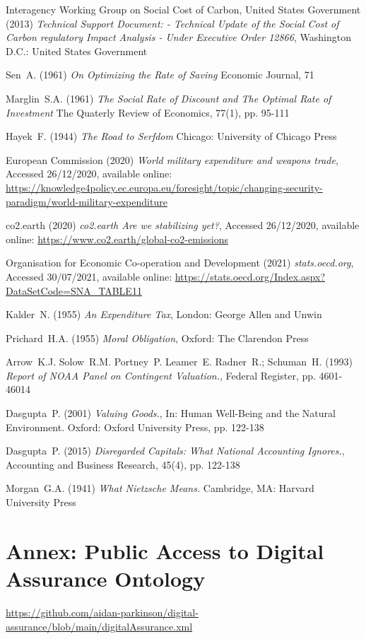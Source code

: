 \documentclass[11pt, oneside]{article}   	%
\begin{document}
\begin{thebibliography}{99}
 Interagency Working Group on Social Cost of Carbon, United States Government (2013)
\emph{Technical Support Document: - Technical Update of the Social Cost of Carbon regulatory Impact Analysis - Under Executive Order 12866},
Washington D.C.: United States Government
	
 Sen~A. (1961)
\emph{On Optimizing the Rate of Saving}
Economic Journal, 71
	
 Marglin~S.A. (1961)
\emph{The Social Rate of Discount and The Optimal Rate of Investment}
The Quaterly Review of Economics, 77(1), pp. 95-111
	
 Hayek~F. (1944)
\emph{The Road to Serfdom}
Chicago: University of Chicago Press
	
 European Commission (2020)
\emph{World military expenditure and weapons trade},
Accessed 26/12/2020, available online: 
\url{https://knowledge4policy.ec.europa.eu/foresight/topic/changing-security-paradigm/world-military-expenditure}
	
 co2.earth (2020)
\emph{co2.earth Are we stabilizing yet?},
Accessed 26/12/2020, available online: 
\url{https://www.co2.earth/global-co2-emissions}
	
 Organisation for Economic Co-operation and Development (2021)
\emph{stats.oecd.org},
Accessed 30/07/2021, available online: 
\url{https://stats.oecd.org/Index.aspx?DataSetCode=SNA_TABLE11}
	
 Kalder~N. (1955)
\emph{An Expenditure Tax},
London: George Allen and Unwin
	
 Prichard~H.A. (1955)
\emph{Moral Obligation},
Oxford: The Clarendon Press

 Arrow~K.J. Solow~R.M. Portney~P. Leamer~E. Radner~R.; Schuman~H. (1993)
\emph{Report of NOAA Panel on Contingent Valuation.},
Federal Register, pp. 4601-46014
	
 Dasgupta~P. (2001)
\emph{Valuing Goods.},
In: Human Well-Being and the Natural Environment. Oxford: Oxford University Press, pp. 122-138
	
 Dasgupta~P. (2015)
\emph{Disregarded Capitals: What National Accounting Ignores.},
Accounting and Business Research, 45(4), pp. 122-138
	
 Morgan~G.A. (1941)
\emph{What Nietzsche Means.}
Cambridge, MA: Harvard University Press

\end{thebibliography}

\section{Annex: Public Access to Digital Assurance Ontology}

\url{https://github.com/aidan-parkinson/digital-assurance/blob/main/digitalAssurance.xml}
\end{document}
